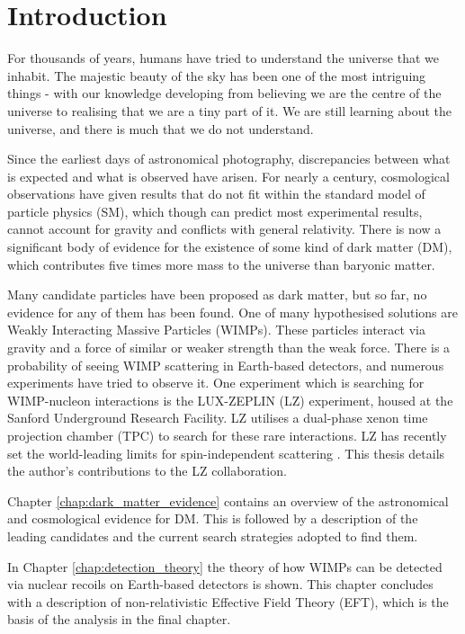 \chapter{Introduction}
\par
For thousands of years, humans have tried to understand the universe that we inhabit.
The majestic beauty of the sky has been one of the most intriguing things - with our knowledge developing from believing we are the centre of the universe to realising that we are a tiny part of it.
We are still learning about the universe, and there is much that we do not understand.
\par
Since the earliest days of astronomical photography, discrepancies between what is expected and what is observed have arisen.
For nearly a century, cosmological observations have given results that do not fit within the standard model of particle physics (SM), which though can predict most experimental results, cannot account for gravity and conflicts with general relativity. 
There is now a significant body of evidence for the existence of some kind of dark matter (DM), which contributes five times more mass to the universe than baryonic matter.
\par
Many candidate particles have been proposed as dark matter, but so far, no evidence for any of them has been found.
One of many hypothesised solutions are Weakly Interacting Massive Particles (WIMPs).
These particles interact via gravity and a force of similar or weaker strength than the weak force.
There is a probability of seeing WIMP scattering in Earth-based detectors, and numerous experiments have tried to observe it.
One experiment which is searching for WIMP-nucleon interactions is the LUX-ZEPLIN (LZ) experiment, housed at the Sanford Underground Research Facility.
LZ utilises a dual-phase xenon time projection chamber (TPC) to search for these rare interactions.
LZ has recently set the world-leading limits for spin-independent scattering \cite{lz_ws_sr1_ref}.
This thesis details the author's contributions to the LZ collaboration.

\par
Chapter \ref{chap:dark_matter_evidence} contains an overview of the astronomical and cosmological evidence for DM.
This is followed by a description of the leading candidates and the current search strategies adopted to find them.

\par
In Chapter \ref{chap:detection_theory} the theory of how WIMPs can be detected via nuclear recoils on Earth-based detectors is shown.
This chapter concludes with a description of non-relativistic Effective Field Theory (EFT), which is the basis of the analysis in the final chapter.

